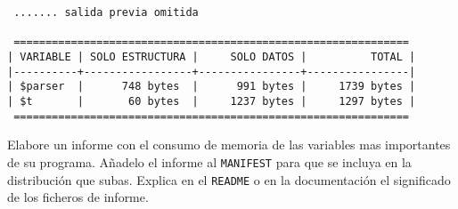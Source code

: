 \begin{enumerate}
\begin{verbatim}
 ....... salida previa omitida

 ==============================================================
| VARIABLE | SOLO ESTRUCTURA |     SOLO DATOS |          TOTAL |
|----------+-----------------+----------------+----------------|
| $parser  |      748 bytes  |      991 bytes |     1739 bytes |
| $t       |       60 bytes  |     1237 bytes |     1297 bytes |
 ==============================================================
\end{verbatim}
Elabore un informe con el consumo de memoria de las variables mas importantes
de su programa.
Añadelo el informe al \verb|MANIFEST| para que se incluya en la distribución 
que subas. Explica en el \verb|README| o en la documentación el significado 
de los ficheros de informe.


\end{enumerate}


